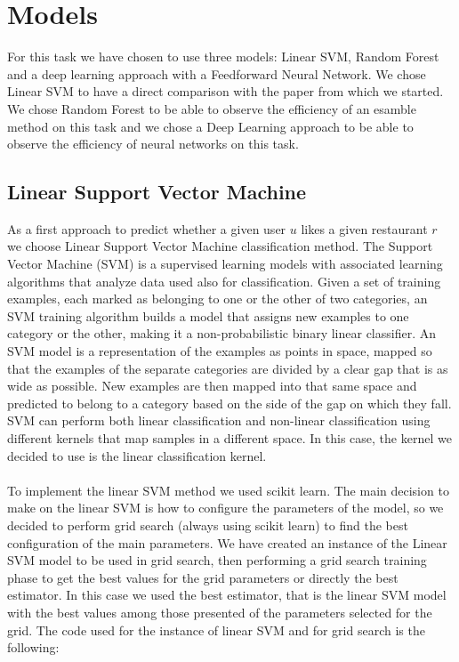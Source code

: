 
\section{Models}

For this task we have chosen to use three models: Linear SVM, Random Forest and a deep learning approach with a Feedforward Neural Network. We chose Linear SVM to have a direct comparison with the paper from which we started. We chose Random Forest to be able to observe the efficiency of an esamble method on this task and we chose a Deep Learning approach to be able to observe the efficiency of neural networks on this task.

\subsection{Linear Support Vector Machine}
As a first approach to predict whether a given user $u$ likes a given restaurant $r$ we choose Linear Support Vector Machine classification method. The Support Vector Machine (SVM) is a supervised learning models with associated learning algorithms that analyze data used also for classification. Given a set of training examples, each marked as belonging to one or the other of two categories, an SVM training algorithm builds a model that assigns new examples to one category or the other, making it a non-probabilistic binary linear classifier. An SVM model is a representation of the examples as points in space, mapped so that the examples of the separate categories are divided by a clear gap that is as wide as possible. New examples are then mapped into that same space and predicted to belong to a category based on the side of the gap on which they fall. SVM can perform both linear classification and non-linear classification using different kernels that map samples in a different space. In this case, the kernel we decided to use is the linear classification kernel.\\
\\
To implement the linear SVM method we used scikit learn. The main decision to make on the linear SVM is how to configure the parameters of the model, so we decided to perform grid search (always using scikit learn) to find the best configuration of the main parameters. We have created an instance of the Linear SVM model to be used in grid search, then performing a grid search training phase to get the best values for the grid parameters or directly the best estimator. In this case we used the best estimator, that is the linear SVM model with the best values among those presented of the parameters selected for the grid. The code used for the instance of linear SVM and for grid search is the following:

